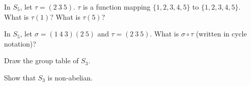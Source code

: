 \begin{myenum}
  \item In $S_5$, let
  $\tau = (2 \ 3 \ 5)$.
  $\tau$ is a function mapping $\{1, 2, 3, 4, 5\}$ to $\{1, 2, 3, 4, 5\}$.
  What is $\tau(1)$? What is $\tau(5)$?
  \item In $S_5$, let
  $\sigma = (1 \ 4 \ 3)(2 \ 5)$ and
  $\tau = (2 \ 3 \ 5)$.
  What is $\sigma \circ \tau$ (written in cycle notation)?
  \item Draw the group table of $S_3$.
  \item Show that $S_3$ is non-abelian.
\end{myenum}
